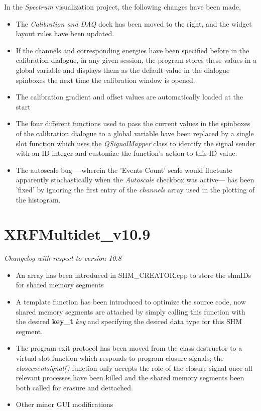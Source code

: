 \documentclass[a4paper,12pt]{article}
\begin{document}
In the \textit{Spectrum} visualization project, the following changes have been made,
\begin{itemize}
	\item The \textit{Calibration and DAQ} dock has been moved to the right, and the widget layout rules have been updated.
	\item If the channels and corresponding energies have been specified before in the calibration dialogue, in any given session, the program stores these values in a global variable and displays them as the default value in the dialogue spinboxes the next time the calibration window is opened.
	\item The calibration gradient and offset values are automatically loaded at the start
	\item The four different functions used to pass the current values in the spinboxes of the calibration dialogue to a global variable have been replaced by a single slot function which uses the \textit{QSignalMapper} class to identify the signal sender with an ID integer and customize the function's action to this ID value.
	\item The autoscale bug ---wherein the 'Events Count' scale would fluctuate apparently stochastically when the \textit{Autoscale} checkbox was active--- has been 'fixed' by ignoring the first entry of the \textit{channels} array used in the plotting of the histogram.
\end{itemize}

\section{XRFMultidet\_v10.9}
\textit{Changelog with respect to version 10.8}

\begin{itemize}
	\item An array has been introduced in SHM\_CREATOR.cpp to store the shmIDs for shared memory segments
	\item A template function has been introduced to optimize the source code, now shared memory segments are attached by simply calling this function with the desired \textbf{key\_t} \textit{key} and specifying the desired data type for this SHM segment.
	\item The program exit protocol has been moved from the class destructor to a virtual slot function which responds to program closure signals; the \textit{closeeventsignal()} function only accepts the role of the closure signal once all relevant processes have been killed and the shared memory segments been both called for erasure and dettached.
	\item Other minor GUI modifications
\end{itemize}
\end{document}
